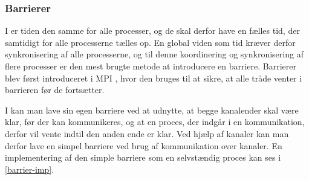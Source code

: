 \subsubsection{Barrierer} \label{sec:barrierer}

I \des er tiden den samme for alle processer, og de skal derfor have en fælles tid, der samtidigt for alle processerne tælles op. En global viden som tid kræver derfor synkronisering af alle 
processerne, og til denne koordinering og synkronisering af flere 
processer er  den mest brugte metode at introducere en barriere. Barrierer blev først introduceret i MPI \cite{mpi-barrier}, hvor den bruges til at 
sikre, at alle tråde venter i barrieren før de  fortsætter. 

I \csp kan man lave sin egen barriere ved at udnytte, at begge 
kanalender skal være klar, før der kan kommunikeres, og at en proces, der 
indgår i en kommunikation, derfor vil vente indtil den anden ende er klar. Ved hjælp af kanaler kan man derfor lave en simpel barriere 
 ved brug af kommunikation over kanaler.  En implementering af den simple 
barriere som en selvstændig proces kan ses i \cref{barrier-imp}.


